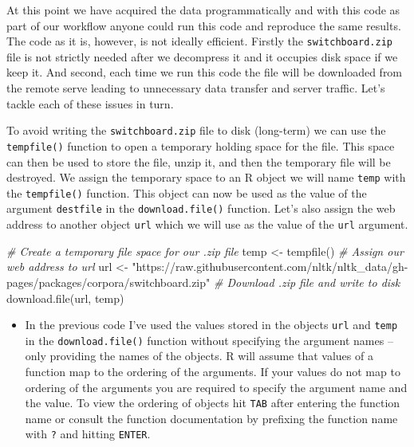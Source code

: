 \documentclass[
]{article}
\newenvironment{Shaded}{\begin{snugshade}}{\end{snugshade}}
\newcommand{\CommentTok}[1]{\textcolor[rgb]{0.56,0.35,0.01}{\textit{#1}}}
\newcommand{\FunctionTok}[1]{\textcolor[rgb]{0.00,0.00,0.00}{#1}}
\newcommand{\NormalTok}[1]{#1}
\newcommand{\OtherTok}[1]{\textcolor[rgb]{0.56,0.35,0.01}{#1}}
\newcommand{\StringTok}[1]{\textcolor[rgb]{0.31,0.60,0.02}{#1}}
\newenvironment{rmdblock}[1]
  {\begin{shaded*}
  \begin{itemize}
  \renewcommand{\labelitemi}{
    \raisebox{-.5\height}[0pt][0pt]{
      {\setkeys{Gin}{width=2em,keepaspectratio}\texttt{[image: assets/images/\#1]}}
    }
  }
  \item
  }
  {
  \end{itemize}
  \end{shaded*}
  }
\newenvironment{rmdtip}
  {\begin{rmdblock}{tip}}
  {\end{rmdblock}}
\begin{document}
At this point we have acquired the data programmatically and with this code as part of our workflow anyone could run this code and reproduce the same results. The code as it is, however, is not ideally efficient. Firstly the \texttt{switchboard.zip} file is not strictly needed after we decompress it and it occupies disk space if we keep it. And second, each time we run this code the file will be downloaded from the remote serve leading to unnecessary data transfer and server traffic. Let's tackle each of these issues in turn.

To avoid writing the \texttt{switchboard.zip} file to disk (long-term) we can use the \texttt{tempfile()} function to open a temporary holding space for the file. This space can then be used to store the file, unzip it, and then the temporary file will be destroyed. We assign the temporary space to an R object we will name \texttt{temp} with the \texttt{tempfile()} function. This object can now be used as the value of the argument \texttt{destfile} in the \texttt{download.file()} function. Let's also assign the web address to another object \texttt{url} which we will use as the value of the \texttt{url} argument.

\begin{Shaded}
\begin{Highlighting}[]
\CommentTok{\# Create a temporary file space for our .zip file}
\NormalTok{temp }\OtherTok{\textless{}{-}} \FunctionTok{tempfile}\NormalTok{()}
\CommentTok{\# Assign our web address to \textasciigrave{}url\textasciigrave{}}
\NormalTok{url }\OtherTok{\textless{}{-}} \StringTok{"https://raw.githubusercontent.com/nltk/nltk\_data/gh{-}pages/packages/corpora/switchboard.zip"}
\CommentTok{\# Download .zip file and write to disk}
\FunctionTok{download.file}\NormalTok{(url, temp)}
\end{Highlighting}
\end{Shaded}

\begin{rmdtip}
In the previous code I've used the values stored in the objects
\texttt{url} and \texttt{temp} in the \texttt{download.file()} function
without specifying the argument names --only providing the names of the
objects. R will assume that values of a function map to the ordering of
the arguments. If your values do not map to ordering of the arguments
you are required to specify the argument name and the value. To view the
ordering of objects hit \texttt{TAB} after entering the function name or
consult the function documentation by prefixing the function name with
\texttt{?} and hitting \texttt{ENTER}.
\end{rmdtip}
\end{document}
